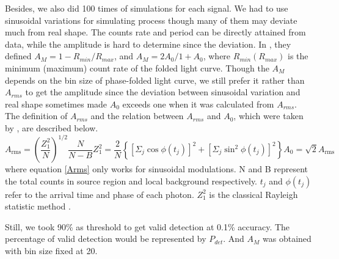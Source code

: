 \documentclass[twoside,twocolumn]{aastex63}
\begin{document}
Besides, we also did 100 times of simulations for each signal. We had to use sinusoidal variations for simulating process though many of them may deviate much from real shape. The counts rate and period can be directly attained from data, while the amplitude is hard to determine since the deviation. In \citet{2012ApJ...746..165H}, they defined $A_{M}={1-R_{min}}/R_{max}$, and $A_{M}=2A_0/{1+A_0}$, where $R_{min}(R_{max})$ is the minimum (maximum) count rate of the folded light curve. 
Though the $A_{M}$ depends on the bin size of phase-folded light curve, we still prefer it rather than $A_{rms}$ to get the amplitude since the deviation between sinusoidal variation and real shape sometimes made $A_{0}$ exceeds one when it was calculated from $A_{rms}$. The definition of $A_{rms}$ and the relation between 
$A_{rms}$ and $A_0$, which were taken by \cite{2012ApJ...746..165H}, are described below.
\begin{subequations}
\begin{equation}
A_{\mathrm{rms}}=\left(\frac{Z_{1}^{2}}{N}\right)^{1 / 2} \frac{N}{N-B}
\end{equation}
\begin{equation}
Z_{1}^{2}=\frac{2}{N}\left\{\left[\Sigma_{j} \cos \phi\left(t_{j}\right)\right]^{2}+\left[\Sigma_{j} \sin ^{2} \phi\left(t_{j}\right)\right]^{2}\right\}
\end{equation}
\begin{equation}\label{Arms}
A_0=\sqrt{2} A_{\mathrm{rms}}
\end{equation}
\end{subequations}
where equation \ref{Arms} only works for sinusoidal modulations. N and B represent the total counts in source region and local background respectively. $t_{j}$ and $\phi\left(t_{j}\right)$ refer to the arrival time and phase of each photon. $Z_{1}^{2}$ is the classical Rayleigh statistic method \citep{1983A&A...128..245B,2003ApJ...599..465M}.

Still, we took 90\% as threshold to get valid detection at 0.1\% accuracy. The percentage of valid detection would be represented by $P_{det}$. And $A_{M}$ was obtained with bin size fixed at 20.

\end{document}
